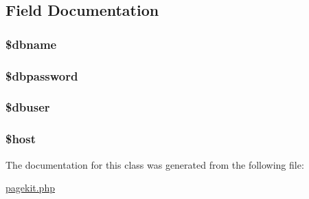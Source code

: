 \subsection{Field Documentation}
\hypertarget{class_kit_settings_ac5111a571fffa2499732833bb7f0d8c1}{
\subsubsection[{\$dbname}]{\setlength{\rightskip}{0pt plus 5cm}\$dbname}}\label{class_kit_settings_ac5111a571fffa2499732833bb7f0d8c1}
\hypertarget{class_kit_settings_a0d42c2db361e096182a30d694e0cd6e4}{
\subsubsection[{\$dbpassword}]{\setlength{\rightskip}{0pt plus 5cm}\$dbpassword}}\label{class_kit_settings_a0d42c2db361e096182a30d694e0cd6e4}
\hypertarget{class_kit_settings_a8d5ac1c3396a540f025f9bbe56a5b568}{
\subsubsection[{\$dbuser}]{\setlength{\rightskip}{0pt plus 5cm}\$dbuser}}\label{class_kit_settings_a8d5ac1c3396a540f025f9bbe56a5b568}
\hypertarget{class_kit_settings_a711797613cb863ca0756df789c396bf2}{
\subsubsection[{\$host}]{\setlength{\rightskip}{0pt plus 5cm}\$host}}\label{class_kit_settings_a711797613cb863ca0756df789c396bf2}


The documentation for this class was generated from the following file\-:\begin{DoxyCompactItemize}
\item 
\hyperlink{pagekit_8php}{pagekit.\-php}\end{DoxyCompactItemize}
